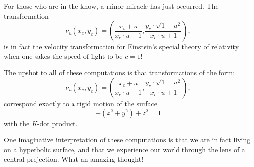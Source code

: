 \documentclass[12pt,noauthor,nooutcomes,handout,hints,newpage]{ximera}
\begin{document}
For those who are in-the-know, a minor miracle has just occurred. The transformation
\[
  \nu_u(x_c,y_c) = \left(\frac{x_c + u}{x_c\cdot u + 1},\frac{y_c\cdot \sqrt{1-u^2}}{x_c\cdot u+1}\right),
\]
is in fact the velocity transformation for Einstein's special theory
of relativity when one takes the speed of light to be $c=1$!

The upshot to all of these computations is that transformations of the form:
\[
\nu_u(x_c,y_c) = \left(\frac{x_c + u}{x_c\cdot u + 1},\frac{y_c\cdot \sqrt{1-u^2}}{x_c\cdot u+1}\right),
\]
correspond exactly to a rigid motion of the surface
\[
-(x^2+y^2) + z^2 =1
\]
with the $K$-dot product.


One imaginative interpretation of these computations is that we are in
fact living on a hyperbolic surface, and that we experience our world
through the lens of a central projection.
What an amazing thought!
\end{document}
